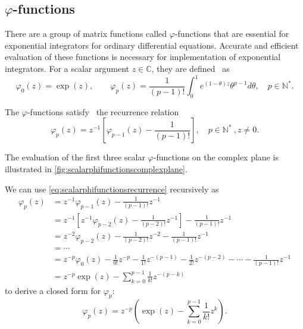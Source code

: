 \subsection{\texorpdfstring{$\varphi$}{Phi}-functions}
There are a group of matrix functions called $\varphi$-functions that are essential
for exponential integrators for ordinary differential equations. Accurate and efficient
evaluation of these functions is necessary for implementation of exponential integrators.
For a scalar argument $z \in \mathbb{C}$, they are defined~\cite{higham2008functions} as
\begin{equation}
    \label{eq:scalarphifunctionsdefinition}
    \varphi_0(z) = \exp(z), \qquad
    \varphi_p(z) = \frac{1}{(p-1)!} \int_{0}^{1}{e^{(1 - \theta)z} \theta^{p-1} d\theta},
    \quad p \in \mathbb{N^*}.
\end{equation}

The $\varphi$-functions satisfy~\cite{higham2008functions} the recurrence relation
\begin{equation}
    \label{eq:scalarphifunctionsrecurrence}
    \varphi_p(z) = z^{-1} \left[ \varphi_{p-1}(z) - \frac{1}{(p-1)!} \right] ,
    \quad p \in \mathbb{N^*} \:, z \neq 0 .
\end{equation}

The evaluation of the first three scalar $\varphi$-functions on the complex plane
is illustrated in \autoref{fig:scalarphifunctionscomplexplane}.

We can use \eqref{eq:scalarphifunctionsrecurrence} recursively as
\begin{equation*}
    \begin{aligned}
        \varphi_p(z) & = z^{-1} \varphi_{p-1}(z) - \frac{1}{(p-1)!} z^{-1} \\
        & = z^{-1} \left[ z^{-1} \varphi_{p-2}(z) - \frac{1}{(p-2)!} z^{-1} \right] - \frac{1}{(p-1)!} z^{-1} \\
        & = z^{-2} \varphi_{p-2}(z) - \frac{1}{(p-2)!} z^{-2} - \frac{1}{(p-1)!} z^{-1} \\
        & = \cdots \\
        & = z^{-p} \varphi_{0}(z) - \frac{1}{0!} z^{-p} - \frac{1}{1!} z^{-(p-1)} - \frac{1}{2!} z^{-(p-2)} - \cdots - \frac{1}{(p-1)!} z^{-1} \\
        & = z^{-p} \exp(z) - \sum_{k=0}^{p-1}{\frac{1}{k!}z^{-(p-k)}}
        \end{aligned}
\end{equation*}
to derive a closed form for $\varphi_p$:
\begin{equation}
    \label{eq:scalarphifunctionsclosedform}
    \varphi_p(z) = z^{-p} \left( \exp(z) - \sum_{k=0}^{p-1}{\frac{1}{k!}z^{k}} \right).
\end{equation}

